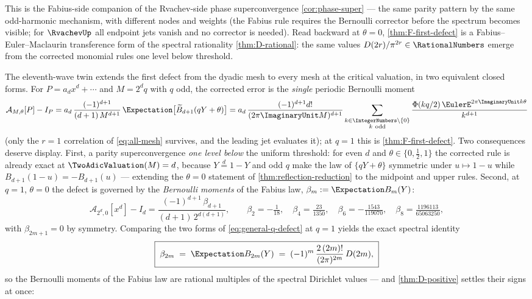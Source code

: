 \documentclass[11pt,oneside]{article}
\numberwithin{equation}{section}
\theoremstyle{definition}
\theoremstyle{remark}
\begin{document}
This is the Fabius-side companion of the Rvachev-side phase
superconvergence \cref{cor:phase-super} --- the same parity pattern by
the same odd-harmonic mechanism, with different nodes and weights (the
Fabius rule requires the Bernoulli corrector before the spectrum
becomes visible; for $\RvachevUp$ all endpoint jets vanish and no corrector is
needed).  Read backward at $\theta=0$, \cref{thm:F-first-defect} is a
Fabius--Euler--Maclaurin transference form of the spectral rationality
\cref{thm:D-rational}: the same values $D(2r)/\pi^{2r}\in\RationalNumbers$ emerge
from the corrected monomial rules one level below threshold.

The eleventh-wave twin extends the first defect from the dyadic mesh
to every mesh at the critical valuation, in two equivalent closed
forms.  For $P=a_dx^{d}+\cdots$ and $M=2^{d}q$ with $q$ odd, the
corrected error is the \emph{single} periodic Bernoulli moment
\begin{equation}
 \mathcal A_{M,\theta}[P]-I_P
 =a_d\,\frac{(-1)^{d+1}}{(d+1)\,M^{d+1}}\,
 \Expectation\bigl[\widetilde B_{d+1}(qY+\theta)\bigr]
 =a_d\,\frac{(-1)^{d+1}d!}{(2\pi\ImaginaryUnit M)^{d+1}}
 \sum_{\substack{k\in\IntegerNumbers\setminus\{0\}\\ k\ \mathrm{odd}}}
 \frac{\Phi(kq/2)\,\EulerE^{2\pi\ImaginaryUnit k\theta}}{k^{d+1}}
 \label{eq:general-q-defect}
\end{equation}
(only the $r=1$ correlation of \eqref{eq:all-mesh} survives, and the
leading jet evaluates it); at $q=1$ this is
\cref{thm:F-first-defect}.  Two consequences deserve display.  First,
a parity superconvergence \emph{one level below} the uniform
threshold: for even $d$ and $\theta\in\{0,\tfrac12,1\}$ the corrected
rule is already exact at $\TwoAdicValuation(M)=d$, because $Y\overset d=1-Y$ and
odd $q$ make the law of $\{qY+\theta\}$ symmetric under
$u\mapsto1-u$ while $B_{d+1}(1-u)=-B_{d+1}(u)$ --- extending the
$\theta=0$ statement of \cref{thm:reflection-reduction} to the
midpoint and upper rules.  Second, at $q=1$, $\theta=0$ the defect is
governed by the \emph{Bernoulli moments} of the Fabius law,
$\beta_m:=\Expectation B_m(Y)$:
\begin{equation}
 \mathcal A_{2^{d},0}[x^{d}]-I_d
 =\frac{(-1)^{d+1}\,\beta_{d+1}}{(d+1)\,2^{d(d+1)}},
 \qquad
 \beta_2=-\tfrac1{18},\quad
 \beta_4=\tfrac{23}{1350},\quad
 \beta_6=-\tfrac{1543}{119070},\quad
 \beta_8=\tfrac{1196113}{65063250},
 \label{eq:beta-defect}
\end{equation}
with $\beta_{2m+1}=0$ by symmetry.  Comparing the two forms of
\eqref{eq:general-q-defect} at $q=1$ yields the exact spectral
identity
\begin{equation}
 \boxed{\;
 \beta_{2m}\;=\;\Expectation B_{2m}(Y)
 \;=\;(-1)^{m}\,\frac{2\,(2m)!}{(2\pi)^{2m}}\,D(2m),\;}
 \label{eq:beta-D}
\end{equation}
so the Bernoulli moments of the Fabius law are rational multiples of
the spectral Dirichlet values --- and \cref{thm:D-positive} settles
their signs at once:
\end{document}
